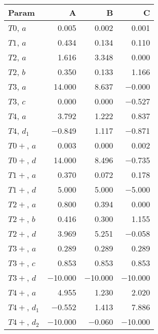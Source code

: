 \begin{tabular}{lrrr}
\toprule
 Param        &       A &       B &       C \\
\midrule
 $T0$, $a$    &   \num{0.005} &   \num{0.002} &   \num{0.001} \\
 $T1$, $a$    &   \num{0.434} &   \num{0.134} &   \num{0.110} \\
 $T2$, $a$    &   \num{1.616} &   \num{3.348} &   \num{0.000} \\
 $T2$, $b$    &   \num{0.350} &   \num{0.133} &   \num{1.166} \\
 $T3$, $a$    &  \num{14.000} &   \num{8.637} &  \num{-0.000} \\
 $T3$, $c$    &   \num{0.000} &   \num{0.000} &  \num{-0.527} \\
 $T4$, $a$    &   \num{3.792} &   \num{1.222} &   \num{0.837} \\
 $T4$, $d_1$  &  \num{-0.849} &   \num{1.117} &  \num{-0.871} \\
 $T0+$, $a$   &   \num{0.003} &   \num{0.000} &   \num{0.002} \\
 $T0+$, $d$   &  \num{14.000} &   \num{8.496} &  \num{-0.735} \\
 $T1+$, $a$   &   \num{0.370} &   \num{0.072} &   \num{0.178} \\
 $T1+$, $d$   &   \num{5.000} &   \num{5.000} &  \num{-5.000} \\
 $T2+$, $a$   &   \num{0.800} &   \num{0.394} &   \num{0.000} \\
 $T2+$, $b$   &   \num{0.416} &   \num{0.300} &   \num{1.155} \\
 $T2+$, $d$   &   \num{3.969} &   \num{5.251} &  \num{-0.058} \\
 $T3+$, $a$   &   \num{0.289} &   \num{0.289} &   \num{0.289} \\
 $T3+$, $c$   &   \num{0.853} &   \num{0.853} &   \num{0.853} \\
 $T3+$, $d$   & \num{-10.000} & \num{-10.000} & \num{-10.000} \\
 $T4+$, $a$   &   \num{4.955} &   \num{1.230} &   \num{2.020} \\
 $T4+$, $d_1$ &  \num{-0.552} &   \num{1.413} &   \num{7.886} \\
 $T4+$, $d_2$ & \num{-10.000} &  \num{-0.060} & \num{-10.000} \\
\bottomrule
\end{tabular}